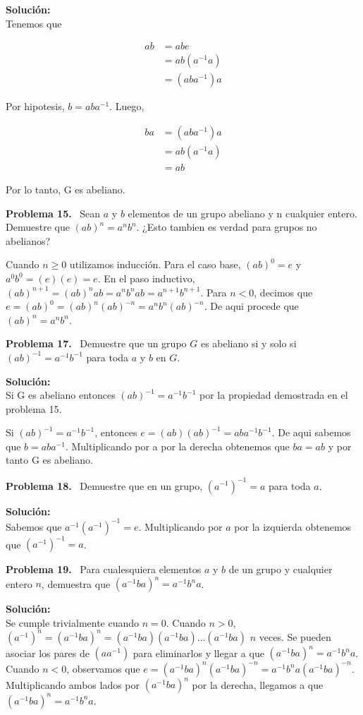 \documentclass{article}
\newcounter{problem}
\newcounter{solution}
\newcommand\Problem[1]{%
  \stepcounter{problem}%
  \textbf{Problema #1.}~%
  \setcounter{solution}{0}%
}
\newcommand\TheSolution{%
  \textbf{Solución:}\\%
}
\begin{document}
\TheSolution{}
Tenemos que

\[
\begin{split}
ab & = abe \\
   & = ab(a^{-1}a) \\
   & = (aba^{-1})a
\end{split}
\]

Por hipotesis, $b = aba^{-1}$. Luego,

\[
\begin{split}
ba & = (aba^{-1})a \\
   & = ab(a^{-1}a) \\
   & = ab
\end{split}
\]

Por lo tanto, G es abeliano.

\Problem{15} Sean $a$ y $b$ elementos de un grupo abeliano y n cualquier entero.
Demuestre que ${(ab)}^n = a^{n}b^n$. ¿Esto tambien es verdad para grupos no
abelianos?

Cuando $n \geq 0$ utilizamos inducción. Para el caso base, ${(ab)}^0 = e$ y
$a^{0}b^{0} = (e)(e) = e$. En el paso inductivo, ${(ab)}^{n + 1} = {(ab)}^{n}ab =
a^{n}b^{n}ab = a^{n + 1}b^{n + 1}$. Para $n < 0$, decimos que $e = {(ab)}^0 =
{(ab)}^{n}{(ab)}^{-n} = a^{n}b^{n}{(ab)}^{-n}$. De aqui procede que ${(ab)}^n =
a^{n}b^{n}$.

\Problem{17} Demuestre que un grupo $G$ es abeliano si y solo si ${(ab)}^{-1} =
a^{-1}b^{-1}$ para toda $a$ y $b$ en $G$.

\TheSolution{} Si G es abeliano entonces ${(ab)}^{-1} = a^{-1}b^{-1}$
por la propiedad demostrada en el problema 15.

Si ${(ab)}^{-1} = a^{-1}b^{-1}$, entonces $e = {(ab)}{(ab)}^{-1} = aba^{-1}b^{-1}$.
De aqui sabemos que $b = aba^{-1}$. Multiplicando por a por la derecha obtenemos que
$ba = ab$ y por tanto G es abeliano.

\Problem{18} Demuestre que en un grupo, ${(a^{-1})}^{-1} = a$ para toda $a$.

\TheSolution{} Sabemos que $a^{-1}{(a^{-1})}^{-1} = e$. Multiplicando por $a$ por la
izquierda obtenemos que ${(a^{-1})}^{-1} = a$.

\Problem{19} Para cualesquiera elementos $a$ y $b$ de un grupo y cualquier entero
$n$, demuestra que ${(a^{-1}ba)}^{n} = a^{-1}b^{n}a$.

\TheSolution{} Se cumple trivialmente cuando $n = 0$. Cuando $n > 0$, ${(a^{-1})}^{n}
= {(a^{-1}ba)}^{n} = {(a^{-1}ba)}{(a^{-1}ba)}\ldots{(a^{-1}ba)}$ $n$ veces. Se
pueden asociar los pares de $(aa^{-1})$ para eliminarlos y llegar a que
${(a^{-1}ba)}^{n} = a^{-1}b^{n}a$. Cuando $n < 0$, observamos que $e =
{(a^{-1}ba)}^{n}{(a^{-1}ba)}^{-n} = a^{-1}b^{n}a{(a^{-1}ba)}^{-n}$. Multiplicando
ambos lados por ${(a^{-1}ba)}^{n}$ por la derecha, llegamos a que ${(a^{-1}ba)}^{n} =
a^{-1}b^{n}a$.
\end{document}
